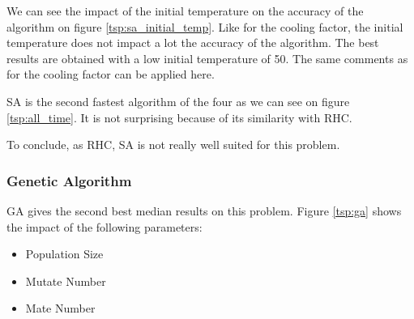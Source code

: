 \documentclass[twocolumn, 10pt]{article}
\begin{document}
				We can see the impact of the initial temperature on the accuracy of the algorithm on figure \ref{tsp:sa_initial_temp}. Like for the cooling factor, the initial temperature does not impact a lot the accuracy of the algorithm. The best results are obtained with a low initial temperature of 50. The same comments as for the cooling factor can be applied here.

				SA is the second fastest algorithm of the four as we can see on figure \ref{tsp:all_time}. It is not surprising because of its similarity with RHC.

				To conclude, as RHC, SA is not really well suited for this problem.
			\subsubsection*{Genetic Algorithm}
				GA gives the second best median results on this problem. Figure \ref{tsp:ga} shows the impact of the following parameters:
				\begin{itemize}
					\item Population Size
					\item Mutate Number
					\item Mate Number
				\end{itemize}
\end{document}
